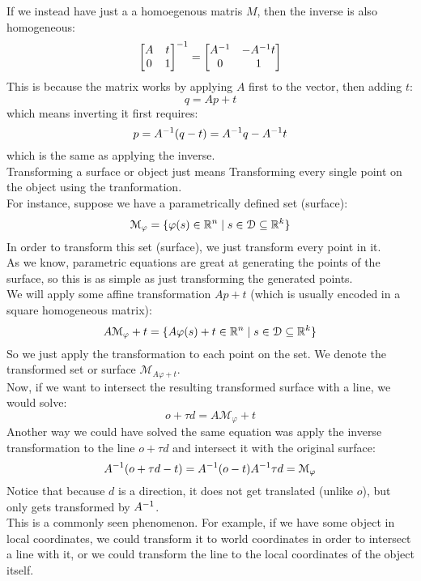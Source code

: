\documentclass[12pt]{article}
\begin{document}
If we instead have just a a homoegenous matris $M$,
then the inverse is also homogeneous:
\[ \begin{bmatrix} {A} & {t} \\ {0} & {1} \end{bmatrix}^{-1}
= \begin{bmatrix} {A^{-1}} & {-A^{-1} t} \\ {0} & {1} \end{bmatrix} \]
This is because the matrix works by applying $A$
first to the vector, then adding $t$:
\[ q = Ap + t \]
which means inverting it first requires:
\[ p = A^{-1}(q - t) = A^{-1} q -A^{-1} t \]
which is the same as applying the inverse. \\

Transforming a surface or object just means Transforming
every single point on the object using the tranformation. \\

For instance, suppose we have
a parametrically defined set (surface):
\[ \mathcal{M}_\varphi = 
\{ \varphi(s) \in \mathbb{R}^n \mid 
s \in \mathcal{D} \subseteq \mathbb{R}^k \} \]
In order to transform this set (surface),
we just transform every point in it. \\
As we know, parametric equations are great at
generating the points of the surface,
so this is as simple as just transforming the
generated points. \\
We will apply some affine transformation $Ap + t$
(which is usually encoded in a square
homogeneous matrix):
\[ A\mathcal{M}_\varphi + t
= \{ A\varphi(s) + t\in \mathbb{R}^n \mid 
s \in \mathcal{D} \subseteq \mathbb{R}^k \} \]
So we just apply the transformation
to each point on the set.
We denote the transformed set or surface
$\mathcal{M}_{A\varphi + t}$. \\

Now, if we want to intersect the resulting
transformed surface with a line,
we would solve:
\[ o + \tau d = A\mathcal{M}_\varphi + t \]
Another way we could have solved the same
equation was apply the inverse transformation
to the line $o + \tau d$
and intersect it with the original surface:
\[ A^{-1}(o + \tau d - t)
= A^{-1}(o - t) A^{-1} \tau d 
= \mathcal{M}_\varphi \]
Notice that because $d$ is a direction,
it does not get translated (unlike $o$),
but only gets transformed by $A^{-1}$. \\
This is a commonly seen phenomenon.
For example, if we have some object in
local coordinates, we could 
transform it to world coordinates
in order to intersect a line with it,
or we could transform the line to the local
coordinates of the object itself. \\
\end{document}
